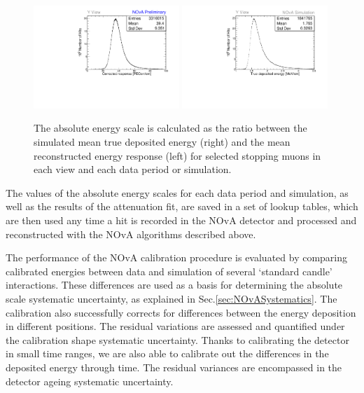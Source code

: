\begin{figure}
    \centering
    \includegraphics[width=0.49\textwidth]{Plots/NOvAExperiment/ExampleAbsCalib_P4_meu_y.pdf}
    \includegraphics[width=0.49\textwidth]{Plots/NOvAExperiment/ExampleAbsCalib_Sim_mev_y.pdf}
    \caption[Example distributions for the NOvA absolute calibration]{The absolute energy scale is calculated as the ratio between the simulated mean true deposited energy (right) and the mean reconstructed energy response (left) for selected stopping muons in each view and each data period or simulation.}
    \label{fig:NOvACalibrationAbsoluteEnergyScale}
\end{figure}


The values of the absolute energy scales for each data period and simulation, as well as the results of the attenuation fit, are saved in a set of lookup tables, which are then used any time a hit is recorded in the \gls{NOvA} detector and processed and reconstructed with the \gls{NOvA} algorithms described above.

The performance of the \gls{NOvA} calibration procedure is evaluated by comparing calibrated energies between data and simulation of several `standard candle' interactions. These differences are used as a basis for determining the absolute scale systematic uncertainty, as explained in Sec.\ref{sec:NOvASystematics}. The calibration also successfully corrects for differences between the energy deposition in different positions. The residual variations are assessed and quantified under the calibration shape systematic uncertainty. Thanks to calibrating the detector in small time ranges, we are also able to calibrate out the differences in the deposited energy through time. The residual variances are encompassed in the detector ageing systematic uncertainty.

